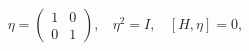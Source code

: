\begin{equation}
\eta=\left(
\begin{array}{cc}
1 & 0 \\
0  & 1
\end{array}
\right),~~~~\eta^{2}=I,~~~~[H,\eta]=0,
\end{equation}

